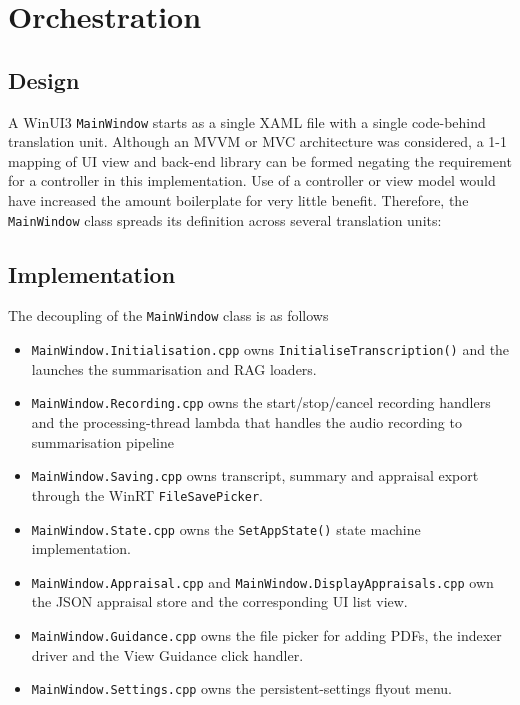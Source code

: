\section{Orchestration}
\label{di:orchestration}
\subsection{Design}
A WinUI3 \texttt{MainWindow} starts as a single XAML file with a single code-behind translation unit. Although an MVVM or MVC architecture was considered, a 1-1 mapping of UI view and back-end library can be formed negating the requirement for a controller in this implementation. Use of a controller or view model would have increased the amount boilerplate for very little benefit. Therefore, the \texttt{MainWindow} class spreads its definition across several translation units:

\subsection{Implementation}
The decoupling of the \texttt{MainWindow} class is as follows

\begin{itemize}
    \item \texttt{MainWindow.Initialisation.cpp} owns \texttt{InitialiseTranscription()} and the launches the summarisation and RAG loaders.
    \item \texttt{MainWindow.Recording.cpp} owns the start/stop/cancel recording handlers and the processing-thread lambda that handles the audio recording to summarisation pipeline
    \item \texttt{MainWindow.Saving.cpp} owns transcript, summary and appraisal export through the WinRT \texttt{FileSavePicker}.
    \item \texttt{MainWindow.State.cpp} owns the \texttt{SetAppState()} state machine implementation.
    \item \texttt{MainWindow.Appraisal.cpp} and \texttt{MainWindow.DisplayAppraisals.cpp} own the JSON appraisal store and the corresponding UI list view.
    \item \texttt{MainWindow.Guidance.cpp} owns the file picker for adding PDFs, the indexer driver and the View Guidance click handler.
    \item \texttt{MainWindow.Settings.cpp} owns the persistent-settings flyout menu.
\end{itemize}


